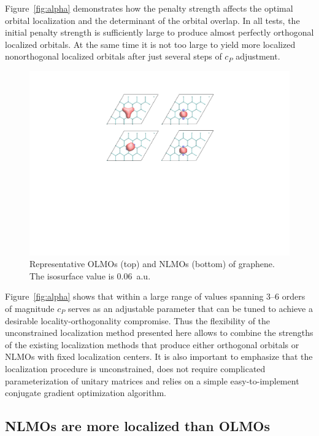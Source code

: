 \documentclass[aps,prl,reprint,amsmath,amssymb]{revtex4-1}
\begin{document}
Figure~\ref{fig:alpha} demonstrates how the penalty strength affects the optimal orbital localization and the determinant of the orbital overlap. In all tests, the initial penalty strength is sufficiently large to produce almost perfectly orthogonal localized orbitals. At the same time it is not too large to yield more localized nonorthogonal localized orbitals after just several steps of $c_P$ adjustment. %
%
\begin{figure}[hbpt]
\centering
\includegraphics[scale=0.6]{graphene.pdf}
\caption{Representative OLMOs (top) and NLMOs (bottom) of graphene. The isosurface value is 0.06~a.u.
}
\label{fig:graphene}
\end{figure}
%

Figure~\ref{fig:alpha} shows that within a large range of values spanning 3--6 orders of magnitude $c_P$ serves as an adjustable parameter that can be tuned to achieve a desirable locality-orthogonality compromise. 
Thus the flexibility of the unconstrained localization method presented here allows to combine the strengths of the existing localization methods that produce either orthogonal orbitals or NLMOs with fixed localization centers. It is also important to emphasize that the localization procedure is unconstrained, does not require complicated parameterization of unitary matrices and relies on a simple easy-to-implement conjugate gradient optimization algorithm. 


\subsection{NLMOs are more localized than OLMOs}
\end{document}

